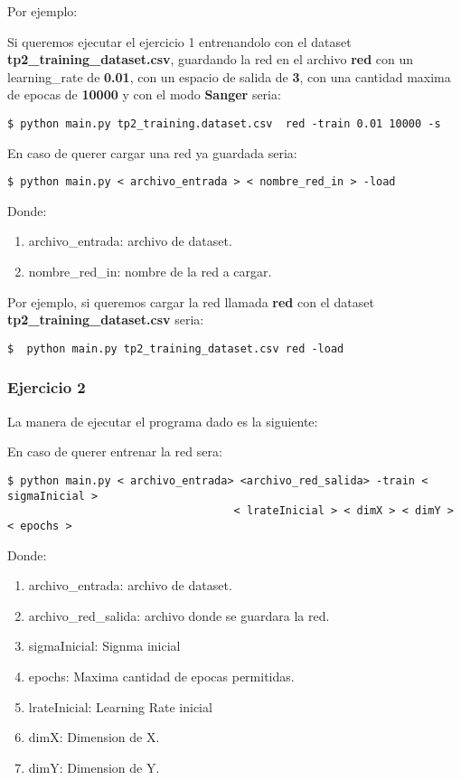 Por ejemplo: 

Si queremos ejecutar el ejercicio 1 entrenandolo con el dataset \textbf{tp2\_training\_dataset.csv}, guardando la red en el archivo 
\textbf{red} con un learning\_rate de \textbf{0.01}, con un espacio de salida de \textbf{3}, con una cantidad maxima de epocas de \textbf{10000} y con el modo \textbf{Sanger} seria:

\begin{verbatim}
$ python main.py tp2_training.dataset.csv  red -train 0.01 10000 -s
\end{verbatim}

En caso de querer cargar una red ya guardada seria:

\begin{verbatim}
$ python main.py < archivo_entrada > < nombre_red_in > -load
\end{verbatim}

Donde:

\begin{enumerate}
\item archivo\_entrada: archivo de dataset.
\item nombre\_red\_in: nombre de la red a cargar.
\end{enumerate}

Por ejemplo, si queremos cargar la red llamada \textbf{red} con el dataset \textbf{tp2\_training\_dataset.csv} seria:

\begin{verbatim}
$  python main.py tp2_training_dataset.csv red -load
\end{verbatim}

\subsubsection{Ejercicio 2}

La manera de ejecutar el programa dado es la siguiente:

En caso de querer entrenar la red sera:

\begin{verbatim}
$ python main.py < archivo_entrada> <archivo_red_salida> -train < sigmaInicial > 
                                   < lrateInicial > < dimX > < dimY > < epochs >
\end{verbatim}

Donde:

\begin{enumerate}
\item archivo\_entrada: archivo de dataset.
\item archivo\_red\_salida: archivo donde se guardara la red.
\item sigmaInicial: Signma inicial
\item epochs: Maxima cantidad de epocas permitidas.
\item lrateInicial: Learning Rate inicial
\item dimX: Dimension de X.
\item dimY: Dimension de Y.
\end{enumerate}

